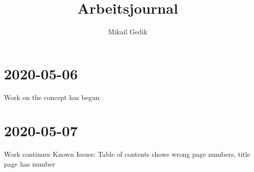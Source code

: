 \documentclass[10pt,a4paper]{article}
\author{Mikail Gedik}
\title{Arbeitsjournal}
\begin{document}
	 \maketitle
	 \section{2020-05-06}
	 Work on the concept has begun
	\section{2020-05-07}
	Work continues\newline
	Known Issues: Table of contents shows wrong page numbers, title page has number
\end{document}
